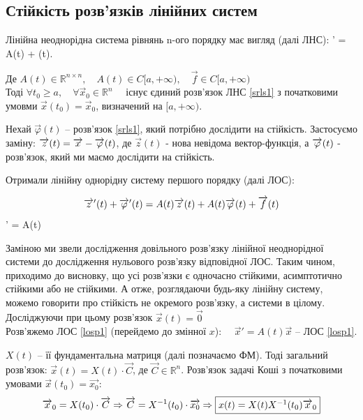 \documentclass[14pt,a4paper]{scrartcl}
\theoremstyle{definition}
\theoremstyle{definition}
\theoremstyle{definition}
\begin{document}
\subsection{Стійкість розв'язків лінійних систем}
Лінійна неоднорідна система рівнянь n-ого порядку має вигляд (далі ЛНС):
\be \label{srls1}
' = A(t)  +  (t).
\ee

$ \text{Де } A(t) \in \mathbb{R}^{n \times n}, \quad A(t) \in C [ a, + \infty), \quad \overrightarrow{f} \in C[a, + \infty)$ \\

Тоді $\forall t_0 \geq a, \quad \forall \overrightarrow{x}_0 \in \mathbb{R}^n \quad$ існує єдиний розв'язок ЛНС \eqref{srls1} з початковими умовми $\overrightarrow{x}(t_0) = \overrightarrow{x}_0$, визначений на $[a, +\infty)$.

Нехай $\overrightarrow{\varphi}(t)$ -- розв'язок \eqref{srls1}, який потрібно дослідити на стійкість.
Застосуємо заміну: $ \overrightarrow{z} (t) = \overrightarrow{x} - \overrightarrow{\varphi} (t)$, де $ \overrightarrow{z}(t)$ - нова невідома вектор-функція, а $\overrightarrow{\varphi} (t)$ - розв'язок, який ми маємо дослідити на стійкість.

Отримали лінійну однорідну систему першого порядку (далі ЛОС):

$$ \overrightarrow{z}'(t)   + \overrightarrow{\varphi}'(t) = A(t)\overrightarrow{z}(t) + A(t)\overrightarrow{\varphi}(t) + \overrightarrow{f}(t) $$
\be \label{losp1}
' = A(t)  
\ee

Заміною ми звели дослідження довільного розв'язку лінійної неоднорідної системи до дослідження нульового розв'язку відповідної ЛОС. Таким чином, приходимо до висновку, що усі розв'язки є одночасно стійкими, асимптотично стійкими або не стійкими. А отже, розглядаючи будь-яку лінійну систему, можемо говорити про стійкість не окремого розв'язку, а системи в цілому. Досліджуючи при цьому розв'язок $\overrightarrow{x}(t) = \overrightarrow{0}$\\

Розв'яжемо ЛОС \eqref{losp1} (перейдемо до змінної $x$): $\quad \overrightarrow{x}'  =  A(t) \overrightarrow{x} $ -- ЛОС \eqref{losp1}.

$X(t) $ -- її фундаментальна матриця (далі позначаємо ФМ). Тоді загальний розв'язок: $ \overrightarrow{x} (t) = X(t) \cdot \overrightarrow{C}$, де $\overrightarrow{ C} \in \mathbb{R}^n$.
Розв'язок задачі Коші з початковими умовами $ \overrightarrow{x} (t_0) = \overrightarrow{x_0}$:
$$
\overrightarrow{x}_0 = X(t_0) \cdot \overrightarrow{C} \Rightarrow \overrightarrow{C} = X^{-1} (t_0) \cdot \overrightarrow{x_0} \Rightarrow \fbox{$x(t) = X(t) X^{-1}(t_0) \overrightarrow{x}_0$}
$$
\end{document}

